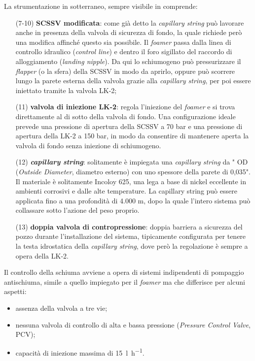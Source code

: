 La strumentazione in sotterraneo, sempre visibile in  comprende:
\begin{itemize}
    \item[(7-10)] \textbf{SCSSV modificata}: come già detto la \textit{capillary string} può lavorare anche in presenza della valvola di sicurezza di fondo, la quale richiede però una modifica affinché questo sia possibile. Il \textit{foamer} passa dalla linea di controllo idraulico (\textit{control line}) e dentro il foro sigillato del raccordo di alloggiamento (\textit{landing nipple}). Da qui lo schiumogeno può pressurizzare il \textit{flapper} (o la sfera) della SCSSV in modo da aprirlo, oppure può scorrere lungo la parete esterna della valvola grazie alla \textit{capillary string}, per poi essere iniettato tramite la valvola LK-2;
    \item[(11)] \textbf{valvola di iniezione LK-2}: regola l'iniezione del \textit{foamer} e si trova direttamente al di sotto della valvola di fondo. Una configurazione ideale prevede una pressione di apertura della SCSSV a 70 bar e una pressione di apertura della LK-2 a 150 bar, in modo da consentire di mantenere aperta la valvola di fondo senza iniezione di schiumogeno.
    \item[(12)] \textit{\textbf{capillary string}}: solitamente è impiegata una \textit{capillary string} da {}" OD (\textit{Outside Diameter}, diametro esterno) con uno spessore della parete di 0,035". Il materiale è solitamente Incoloy 625, una lega a base di nickel eccellente in ambienti corrosivi e dalle alte temperature. La capillary string può essere applicata fino a una profondità di 4.000 m, dopo la quale l'intero sistema può collassare sotto l'azione del peso proprio.
    \item[(13)] \textbf{doppia valvola di contropressione}: doppia barriera a sicurezza del pozzo durante l'installazione del sistema, tipicamente configurata per tenere la testa idrostatica della \textit{capillary string}, dove però la regolazione è sempre a opera della LK-2.
\end{itemize}
Il controllo della schiuma avviene a opera di sistemi indipendenti di pompaggio antischiuma, simile a quello impiegato per il \textit{foamer} ma che differisce per alcuni aspetti:
\begin{itemize}
    \item assenza della valvola a tre vie;
    \item nessuna valvola di controllo di alta e bassa pressione (\textit{Pressure Control Valve}, PCV);
    \item capacità di iniezione massima di \SI{15}{\litre\per\hour}.
\end{itemize}

